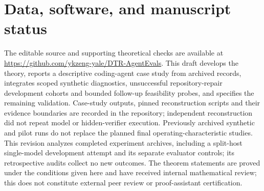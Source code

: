 \documentclass[11pt]{article}
\theoremstyle{definition}
\theoremstyle{remark}
\begin{document}
\section*{Data, software, and manuscript status}
The editable source and supporting theoretical checks are available at
\url{https://github.com/ykzeng-yale/DTR-AgentEvals}.
This draft develops the theory, reports a descriptive coding-agent case study from archived records,
integrates scoped synthetic diagnostics, unsuccessful repository-repair development cohorts and bounded
follow-up feasibility probes, and specifies the remaining validation. Case-study outputs, pinned reconstruction scripts and their
evidence boundaries are recorded in the repository; independent reconstruction did not repeat model or
hidden-verifier execution. Previously archived synthetic and pilot runs do not replace the planned final
operating-characteristic studies. This revision analyzes completed experiment archives, including a split-host single-model development attempt and its separate evaluator controls; its retrospective audits collect no new outcomes.
The theorem statements are proved under the conditions given here and have received internal mathematical review; this does not constitute external peer review or proof-assistant certification.


\begingroup
\raggedright

\endgroup
\end{document}
